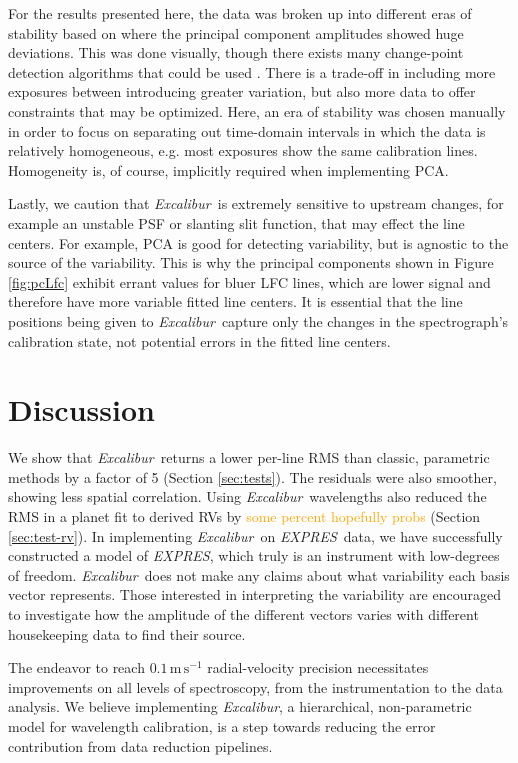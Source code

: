 \documentclass[modern]{aastex63}
\newcommand{\project}[1]{\textsl{#1}}
\newcommand{\name}{\project{Excalibur}}
\newcommand{\acronym}[1]{{\small{#1}}}
\newcommand{\expres}{\project{\acronym{EXPRES}}}
\newcommand{\lz}[1]{\textcolor{orange}{#1}}
\newcommand{\mps}{\mathrm{m\,s^{-1}}}
\begin{document}
For the results presented here, the data was broken up into different eras of stability based on where the principal component amplitudes showed huge deviations.  This was done visually, though there exists many change-point detection algorithms that could be used \citep{aminikhanghahi2017}.  There is a trade-off in including more exposures between introducing greater variation, but also more data to offer constraints that may be optimized.  Here, an era of stability was chosen  manually in order to focus on separating out time-domain intervals in which the data is relatively homogeneous, e.g. most exposures show the same calibration lines.  Homogeneity is, of course, implicitly required when implementing PCA.

Lastly, we caution that \name\ is extremely sensitive to upstream changes, for example an unstable PSF or slanting slit function, that may effect the line centers.  For example, PCA is good for detecting variability, but is agnostic to the source of the variability.  This is why the principal components shown in Figure \ref{fig:pcLfc} exhibit errant values for bluer LFC lines, which are lower signal and therefore have more variable fitted line centers.  It is essential that the line positions being given to \name\ capture only the changes in the spectrograph's calibration state, not potential errors in the fitted line centers. 


\section{Discussion} \label{sec:discussion}
We show that \name\ returns a lower per-line RMS than classic, parametric methods by a factor of 5 (Section \ref{sec:tests}).  The residuals were also smoother, showing less spatial correlation.  Using \name\ wavelengths also reduced the RMS in a planet fit to derived RVs by \lz{some percent hopefully probs} (Section \ref{sec:test-rv}).  In implementing \name\ on \expres\ data, we have successfully constructed a model of \expres, which truly is an instrument with low-degrees of freedom.  \name\ does not make any claims about what variability each basis vector represents.  Those interested in interpreting the variability are encouraged to investigate how the amplitude of the different vectors varies with different housekeeping data to find their source.

The endeavor to reach $0.1\,\mps$ radial-velocity precision necessitates improvements on all levels of spectroscopy, from the instrumentation to the data analysis.  We believe implementing \name, a hierarchical, non-parametric model for wavelength calibration, is a step towards reducing the error contribution from data reduction pipelines.
\end{document}
